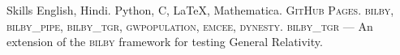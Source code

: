 
\begin{rubric}{Skills}
\entry*[Languages]
	English, Hindi.
	Python, C, \LaTeX, Mathematica.
	\textsc{GitHub Pages}.
\entry*[Packages]
	\textsc{bilby, bilby\_pipe, bilby\_tgr, gwpopulation, emcee, dynesty}.
	\textsc{bilby\_tgr} --- An extension of the \textsc{bilby} framework for testing General Relativity.
    
\end{rubric}
